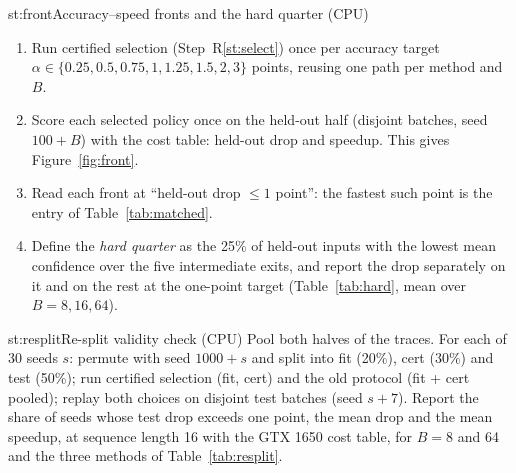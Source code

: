 \begin{step}{st:front}{Accuracy--speed fronts and the hard quarter (CPU)}
\begin{enumerate}
  \item Run certified selection (Step~R\ref{st:select}) once per accuracy target
  $\alpha\in\{0.25, 0.5, 0.75, 1, 1.25, 1.5, 2, 3\}$ points, reusing one path per method and $B$.
  \item Score each selected policy once on the held-out half (disjoint batches, seed $100+B$) with the cost table:
  held-out drop and speedup. This gives Figure~\ref{fig:front}.
  \item Read each front at ``held-out drop $\le1$ point'': the fastest such point is the entry of
  Table~\ref{tab:matched}.
  \item Define the \emph{hard quarter} as the 25\% of held-out inputs with the lowest mean confidence over the five
  intermediate exits, and report the drop separately on it and on the rest at the one-point target
  (Table~\ref{tab:hard}, mean over $B=8,16,64$).
\end{enumerate}
\end{step}

\begin{step}{st:resplit}{Re-split validity check (CPU)}
Pool both halves of the traces. For each of 30 seeds $s$: permute with seed $1000+s$ and split into fit (20\%), cert
(30\%) and test (50\%); run certified selection (fit, cert) and the old protocol (fit + cert pooled); replay both
choices on disjoint test batches (seed $s+7$). Report the share of seeds whose test drop exceeds one point, the mean
drop and the mean speedup, at sequence length 16 with the GTX 1650 cost table, for $B=8$ and 64 and the three methods
of Table~\ref{tab:resplit}.
\end{step}

